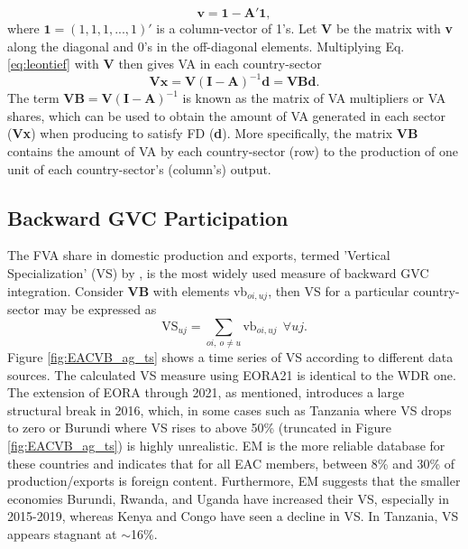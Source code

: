 \documentclass[a4paper]{article}
\begin{document}
%
\begin{equation}
\textbf{v} = \textbf{1} - \textbf{A}'\textbf{1},
\end{equation}
%
where $\textbf{1} = (1, 1, 1, ..., 1)'$ is a column-vector of 1's. Let \textbf{V} be the matrix with \textbf{v} along the diagonal and 0's in the off-diagonal elements. Multiplying Eq. \ref{eq:leontief} with $\textbf{V}$ then gives VA in each country-sector
%
\begin{equation} \label{eq:VB}
\textbf{V}\textbf{x} = \textbf{V}(\textbf{I}-\textbf{A})^{-1} \textbf{d} = \textbf{VBd}.
\end{equation}
%
The term $\textbf{VB} = \textbf{V}(\textbf{I}-\textbf{A})^{-1}$ is known as the matrix of VA multipliers or VA shares, which can be used to obtain the amount of VA generated in each sector (\textbf{Vx}) when producing to satisfy FD (\textbf{d}). More specifically, the matrix $\textbf{VB}$ contains the amount of VA by each country-sector (row) to the production of one unit of each country-sector's (column's) output. 


\subsection{Backward GVC Participation}

The FVA share in domestic production and exports, termed 'Vertical Specialization' (VS) by \citet{hummels2001nature}, is the most widely used measure of backward GVC integration. Consider \textbf{VB} with elements vb$_{oi,uj}$, then VS for a particular country-sector may be expressed as
%
\begin{equation} \label{eq:VS}
\text{VS}_{uj} = \sum_{oi,\ o \neq  u} \text{vb}_{oi, uj}\ \ \forall uj.
\end{equation}
%
Figure \ref{fig:EACVB_ag_ts} shows a time series of VS according to different data sources. The calculated VS measure using EORA21 is identical to the WDR one. The extension of EORA through 2021, as mentioned, introduces a large structural break in 2016, which, in some cases such as Tanzania where VS drops to zero or Burundi where VS rises to above 50\% (truncated in Figure \ref{fig:EACVB_ag_ts}) is highly unrealistic. EM is the more reliable database for these countries and indicates that for all EAC members, between 8\% and 30\% of production/exports is foreign content. Furthermore, EM suggests that the smaller economies Burundi, Rwanda, and Uganda have increased their VS, especially in 2015-2019, whereas Kenya and Congo have seen a decline in VS. In Tanzania, VS appears stagnant at $\sim$16\%. 
\end{document}
